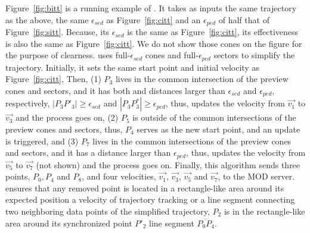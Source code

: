 \begin{example}
	Figure~\ref{fig:bitt} is a running example of \bitt. It takes as inputs the same trajectory as the above, the same $\epsilon_{sed}$ as Figure~\ref{fig:citt} and an $\epsilon_{ped}$ of half that of Figure~\ref{fig:sitt}. Because, its $\epsilon_{sed}$ is the same as Figure~\ref{fig:citt}, its effectiveness is also the same as Figure~\ref{fig:citt}. We do not show those cones on the figure for the purpose of clearness.
	\bitt uses full-$\epsilon_{sed}$ cones and full-$\epsilon_{ped}$ sectors to simplify the trajectory. Initially, it sets the same start point and initial velocity as Figure~\ref{fig:citt}, 
	Then, (1) $P_3$ lives in the common intersection of the preview cones and sectors, and it has both \sed and \ped distances larger than $\epsilon_{sed}$ and $\epsilon_{ped}$, respectively, \ie $|P_3P'_3| \ge \epsilon_{sed}$ and $|P_3P^*_3| \ge \epsilon_{ped}$, thus, \bitt updates the velocity from $\vec{v_1}$ to $\vec{v_3}$ and the process goes on, (2) $P_5$ is outside of the common intersections of the preview cones and sectors, thus, $P_4$ serves as the new start point, and an update is triggered, and (3) $P_7$ lives in the common intersections of the preview cones and sectors, and it has a \ped distance larger than $\epsilon_{ped}$, thus, \bitt updates the velocity from $\vec{v_5}$ to $\vec{v_7}$ (not shown) and the process goes on. Finally, this algorithm sends three points, $P_0, P_4$ and $P_8$, and four velocities, $\vec{v_1}$, $\vec{v_3}$, $\vec{v_5}$ and $\vec{v_7}$, to the MOD server. 
	\bitt ensures that any removed point is located in a rectangle-like area around its expected position \wrt a velocity of trajectory tracking or a line segment connecting two neighboring data points of the simplified trajectory, \eg $P_2$ is in the rectangle-like area around its synchronized point $P'_2$ \wrt line segment $\overline{P_0P_4}$. 
\end{example}


